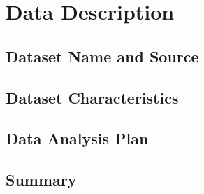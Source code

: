 \chapter{Data Description}
\label{ch:data}


\section{Dataset Name and Source}
\label{sec:data-source}

\section{Dataset Characteristics}
\label{sec:data-characteristics}

\section{Data Analysis Plan}
\label{sec:data-plan}

\section{Summary}
\label{sec:data-summary}
